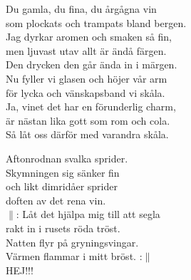 \documentclass[a6paper,10pt]{article}
\begin{document}
\setlength{\oddsidemargin}{-0.37in}
\noindent
\begin{center}
\end{center}
\begin{lyrics}
Du gamla, du fina, du årgågna vin\\
som plockats och trampats bland bergen.\\
Jag dyrkar aromen och smaken så fin,\\
men ljuvast utav allt är ändå färgen.\\
Den drycken den går ända in i märgen.
\vspace{5pt}\\
Nu fyller vi glasen och höjer vår arm\\
för lycka och vänskapsband vi skåla.\\
Ja, vinet det har en förunderlig charm,\\
är nästan lika gott som rom och cola.\\
Så låt oss därför med varandra skåla.
\end{lyrics}
\vspace{40pt}
\begin{center}
\end{center}
\begin{lyrics}
Aftonrodnan svalka sprider.\\
Skymningen sig sänker fin\\
och likt dimridåer sprider\\
doften av det rena vin.
\vspace{5pt}\\
$\|$: Låt det hjälpa mig till att segla\\
rakt in i rusets röda tröst.\\
Natten flyr på gryningsvingar.\\
Värmen flammar i mitt bröst. :$\|$\\
HEJ!!!
\end{lyrics}
\end{document}
